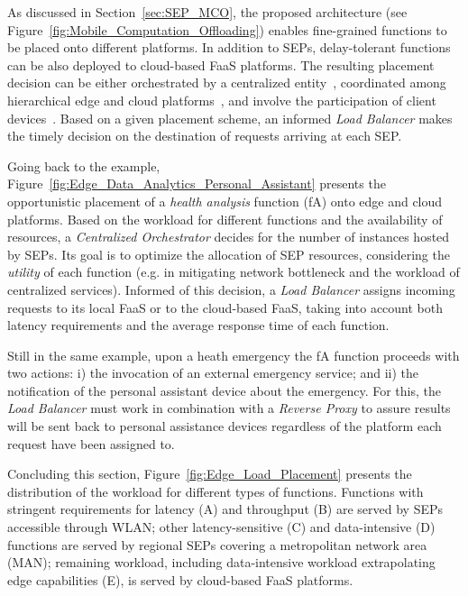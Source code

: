 As discussed in Section~\ref{sec:SEP_MCO}, the proposed architecture (see Figure~\ref{fig:Mobile_Computation_Offloading}) enables fine-grained functions to be placed onto different platforms. In addition to SEPs, delay-tolerant functions can be also deployed to cloud-based FaaS platforms. The resulting placement decision can be either orchestrated by a centralized entity~\cite{Taleb:2013}, coordinated among hierarchical edge and cloud platforms~\cite{Mach:2017}, and involve the participation of client devices~\cite{Baresi:2018}. Based on a given placement scheme, an informed \textit{Load Balancer} makes the timely decision on the destination of requests arriving at each SEP.


Going back to the example, Figure~\ref{fig:Edge_Data_Analytics_Personal_Assistant} presents the opportunistic placement of a \textit{health analysis} function (fA) onto edge and cloud platforms. Based on the workload for different functions and the availability of resources, a \textit{Centralized Orchestrator} decides for the number of instances hosted by SEPs. Its goal is to optimize the allocation of SEP resources, considering the \textit{utility} of each function (e.g. in mitigating network bottleneck and the workload of centralized services). Informed of this decision, a \textit{Load Balancer} assigns incoming requests to its local FaaS or to the cloud-based FaaS, taking into account both latency requirements and the average response time of each function. 

Still in the same example, upon a heath emergency the fA function proceeds with two actions: i) the invocation of an external emergency service; and ii) the notification of the personal assistant device about the emergency. For this, the \textit{Load Balancer} must work in combination with a \textit{Reverse Proxy} to assure results will be sent back to personal assistance devices regardless of the platform each request have been assigned to.

Concluding this section, Figure~\ref{fig:Edge_Load_Placement} presents the distribution of the workload for different types of functions. Functions with stringent requirements for latency (A) and throughput (B) are served by SEPs accessible through WLAN; other latency-sensitive (C) and data-intensive (D) functions are served by regional SEPs covering a metropolitan network area (MAN); remaining workload, including data-intensive workload extrapolating edge capabilities (E), is served by cloud-based FaaS platforms.

